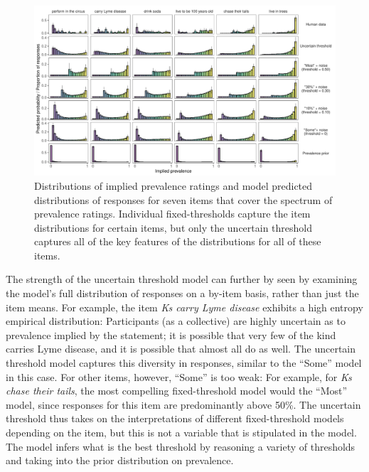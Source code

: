 \documentclass[floatsintext,doc]{apa6}
\begin{document}
\begin{figure}
\centering
\includegraphics{figs/genint-fullDistributions-variousFixeds-1.pdf}
\caption{Distributions of implied prevalence ratings and model predicted distributions of responses for seven items that cover the spectrum of prevalence ratings. Individual fixed-thresholds capture the item distributions for certain items, but only the uncertain threshold captures all of the key features of the distributions for all of these items.
}
\label{fig:genint-modelingResults-bars}
\end{figure}

The strength of the uncertain threshold model can further by seen by examining the model's full distribution of responses on a by-item basis, rather than just the item means.
For example, the item \emph{Ks carry Lyme disease} exhibits a high entropy empirical distribution: Participants (as a collective) are highly uncertain as to prevalence implied by the statement; it is possible that very few of the kind carries Lyme disease, and it is possible that almost all do as well. 
The uncertain threshold model captures this diversity in responses, similar to the ``Some'' model in this case. 
For other items, however, ``Some'' is too weak: For example, for \emph{Ks chase their tails}, the most compelling fixed-threshold model would the ``Most'' model, since responses for this item are predominantly above 50\%. 
The uncertain threshold thus takes on the interpretations of different fixed-threshold models depending on the item, but this is not a variable that is stipulated in the model. 
The model infers what is the best threshold by reasoning a variety of thresholds and taking into the prior distribution on prevalence. 


\end{document}
